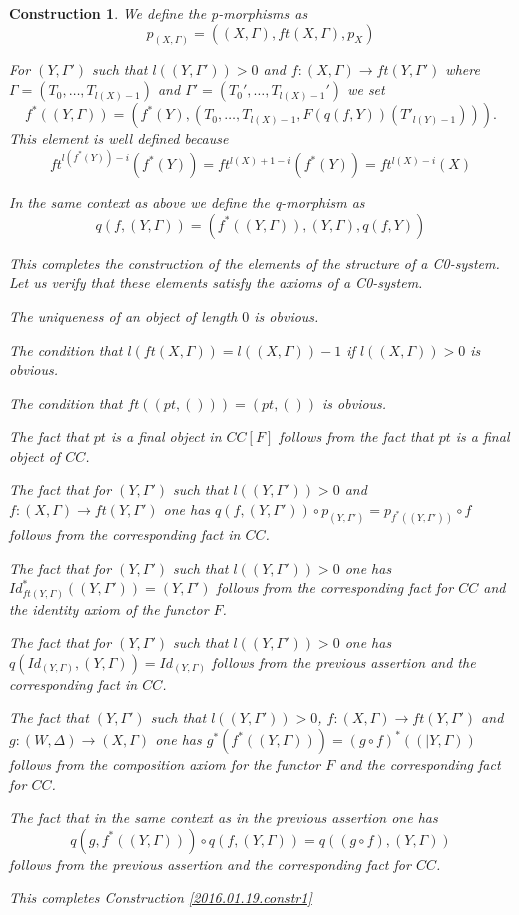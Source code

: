 \documentclass[11pt]{article}
\newtheorem{construction}[proposition]{Construction}
\newcommand{\sr}{\rightarrow}
\begin{document}
\begin{construction}
We define the p-morphisms as 
%
$$p_{(X,\Gamma)}=((X,\Gamma),ft(X,\Gamma), p_X)$$

For $(Y,\Gamma')$ such that $l((Y,\Gamma'))>0$ and $f:(X,\Gamma)\sr ft(Y,\Gamma')$ where $\Gamma=(T_0,\dots,T_{l(X)-1})$ and $\Gamma'=(T_0',\dots,T_{l(X)-1}')$ we set
%
$$f^*((Y,\Gamma))=(f^*(Y),(T_0,\dots,T_{l(X)-1},F(q(f,Y))(T'_{l(Y)-1}))).$$
%
This element is well defined because
%
$$ft^{l(f^*(Y))-i}(f^*(Y))=ft^{l(X)+1-i}(f^*(Y))=ft^{l(X)-i}(X)$$
%

In the same context as above we define the q-morphism as
%
$$q(f,(Y,\Gamma))=(f^*((Y,\Gamma)),(Y,\Gamma),q(f,Y))$$

This completes the construction of the elements of the structure of a C0-system. Let us verify that these elements satisfy the axioms of a C0-system. 

The uniqueness of an object of length $0$ is obvious.

The condition that $l(ft(X,\Gamma))=l((X,\Gamma))-1$ if $l((X,\Gamma))>0$ is obvious.

The condition that $ft((pt,()))=(pt,())$ is obvious. 

The fact that $pt$ is a final object in $CC[F]$ follows from the fact that $pt$ is a final object of $CC$.

The fact that for $(Y,\Gamma')$ such that $l((Y,\Gamma'))>0$ and $f:(X,\Gamma)\sr ft(Y,\Gamma')$ one has $q(f,(Y,\Gamma'))\circ p_{(Y,\Gamma')}=p_{f^*((Y,\Gamma'))}\circ f$ follows from the corresponding fact in $CC$.

The fact that for $(Y,\Gamma')$ such that $l((Y,\Gamma'))>0$ one has $Id_{ft(Y,\Gamma)}^*((Y,\Gamma'))=(Y,\Gamma')$ follows from the corresponding fact for $CC$ and the identity axiom of the functor $F$. 

The fact that for $(Y,\Gamma')$ such that $l((Y,\Gamma'))>0$ one has $q(Id_{(Y,\Gamma)},(Y,\Gamma))=Id_{(Y,\Gamma)}$ follows from the previous assertion and the corresponding fact in $CC$.

The fact that $(Y,\Gamma')$ such that $l((Y,\Gamma'))>0$, $f:(X,\Gamma)\sr ft(Y,\Gamma')$ and $g:(W,\Delta)\sr (X,\Gamma)$ one has $g^*(f^*((Y,\Gamma)))=(g\circ f)^*((|Y,\Gamma))$ follows from the composition axiom for the functor $F$ and the corresponding fact for $CC$.

The fact that in the same context as in the previous assertion one has
%
$$q(g,f^*((Y,\Gamma)))\circ q(f,(Y,\Gamma))=q((g\circ f),(Y,\Gamma))$$
%
follows from the previous assertion and the corresponding fact for $CC$. 

This completes Construction \ref{2016.01.19.constr1}
\end{construction}
\end{document}
